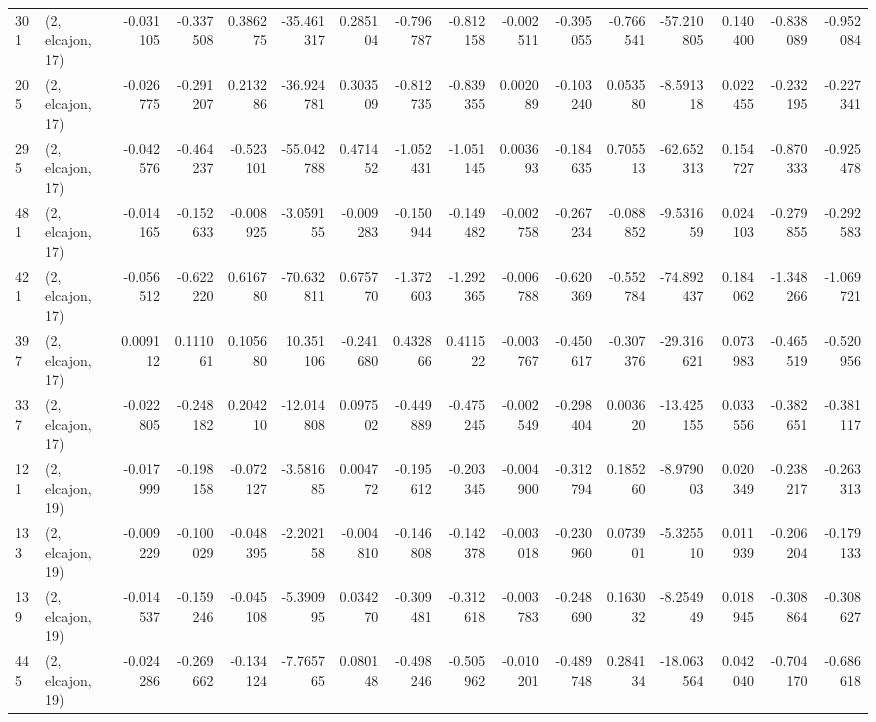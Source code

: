\begin{tabular}{llrrrrrrrrrrrrrr}
301 &  (2, elcajon, 17) &  -0.031105 & -0.337508 &  0.386275 &  -35.461317 &  0.285104 &  -0.796787 & -0.812158 & -0.002511 & -0.395055 & -0.766541 &  -57.210805 &  0.140400 & -0.838089 & -0.952084 \\
205 &  (2, elcajon, 17) &  -0.026775 & -0.291207 &  0.213286 &  -36.924781 &  0.303509 &  -0.812735 & -0.839355 &  0.002089 & -0.103240 &  0.053580 &   -8.591318 &  0.022455 & -0.232195 & -0.227341 \\
295 &  (2, elcajon, 17) &  -0.042576 & -0.464237 & -0.523101 &  -55.042788 &  0.471452 &  -1.052431 & -1.051145 &  0.003693 & -0.184635 &  0.705513 &  -62.652313 &  0.154727 & -0.870333 & -0.925478 \\
481 &  (2, elcajon, 17) &  -0.014165 & -0.152633 & -0.008925 &   -3.059155 & -0.009283 &  -0.150944 & -0.149482 & -0.002758 & -0.267234 & -0.088852 &   -9.531659 &  0.024103 & -0.279855 & -0.292583 \\
421 &  (2, elcajon, 17) &  -0.056512 & -0.622220 &  0.616780 &  -70.632811 &  0.675770 &  -1.372603 & -1.292365 & -0.006788 & -0.620369 & -0.552784 &  -74.892437 &  0.184062 & -1.348266 & -1.069721 \\
397 &  (2, elcajon, 17) &   0.009112 &  0.111061 &  0.105680 &   10.351106 & -0.241680 &   0.432866 &  0.411522 & -0.003767 & -0.450617 & -0.307376 &  -29.316621 &  0.073983 & -0.465519 & -0.520956 \\
337 &  (2, elcajon, 17) &  -0.022805 & -0.248182 &  0.204210 &  -12.014808 &  0.097502 &  -0.449889 & -0.475245 & -0.002549 & -0.298404 &  0.003620 &  -13.425155 &  0.033556 & -0.382651 & -0.381117 \\
121 &  (2, elcajon, 19) &  -0.017999 & -0.198158 & -0.072127 &   -3.581685 &  0.004772 &  -0.195612 & -0.203345 & -0.004900 & -0.312794 &  0.185260 &   -8.979003 &  0.020349 & -0.238217 & -0.263313 \\
133 &  (2, elcajon, 19) &  -0.009229 & -0.100029 & -0.048395 &   -2.202158 & -0.004810 &  -0.146808 & -0.142378 & -0.003018 & -0.230960 &  0.073901 &   -5.325510 &  0.011939 & -0.206204 & -0.179133 \\
139 &  (2, elcajon, 19) &  -0.014537 & -0.159246 & -0.045108 &   -5.390995 &  0.034270 &  -0.309481 & -0.312618 & -0.003783 & -0.248690 &  0.163032 &   -8.254949 &  0.018945 & -0.308864 & -0.308627 \\
445 &  (2, elcajon, 19) &  -0.024286 & -0.269662 & -0.134124 &   -7.765765 &  0.080148 &  -0.498246 & -0.505962 & -0.010201 & -0.489748 &  0.284134 &  -18.063564 &  0.042040 & -0.704170 & -0.686618 \\

\end{tabular}
